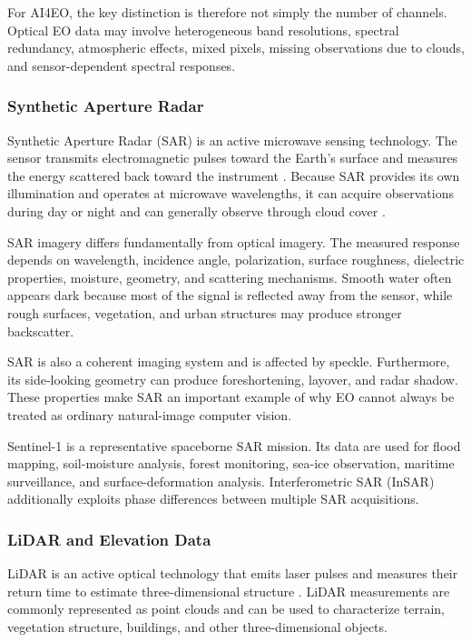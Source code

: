\documentclass[11pt,a4paper]{article}
\begin{document}
For AI4EO, the key distinction is therefore not simply the number of
channels. Optical EO data may involve heterogeneous band resolutions,
spectral redundancy, atmospheric effects, mixed pixels, missing
observations due to clouds, and sensor-dependent spectral responses.

\subsubsection{Synthetic Aperture Radar}

Synthetic Aperture Radar (SAR) is an active microwave sensing technology.
The sensor transmits electromagnetic pulses toward the Earth's surface
and measures the energy scattered back toward the instrument
\cite{moreira2013sar}. Because SAR provides its own illumination and
operates at microwave wavelengths, it can acquire observations during
day or night and can generally observe through cloud cover
\cite{esa_sentinel1_instrument}.

SAR imagery differs fundamentally from optical imagery. The measured
response depends on wavelength, incidence angle, polarization, surface
roughness, dielectric properties, moisture, geometry, and scattering
mechanisms. Smooth water often appears dark because most of the signal
is reflected away from the sensor, while rough surfaces, vegetation, and
urban structures may produce stronger backscatter.

SAR is also a coherent imaging system and is affected by speckle.
Furthermore, its side-looking geometry can produce foreshortening,
layover, and radar shadow. These properties make SAR an important
example of why EO cannot always be treated as ordinary natural-image
computer vision.

Sentinel-1 is a representative spaceborne SAR mission. Its data are used
for flood mapping, soil-moisture analysis, forest monitoring, sea-ice
observation, maritime surveillance, and surface-deformation analysis.
Interferometric SAR (InSAR) additionally exploits phase differences
between multiple SAR acquisitions.

\subsubsection{LiDAR and Elevation Data}

LiDAR is an active optical technology that emits laser pulses and
measures their return time to estimate three-dimensional structure
\cite{baltsavias1999airborne}. LiDAR measurements are commonly
represented as point clouds and can be used to characterize terrain,
vegetation structure, buildings, and other three-dimensional objects.
\end{document}
